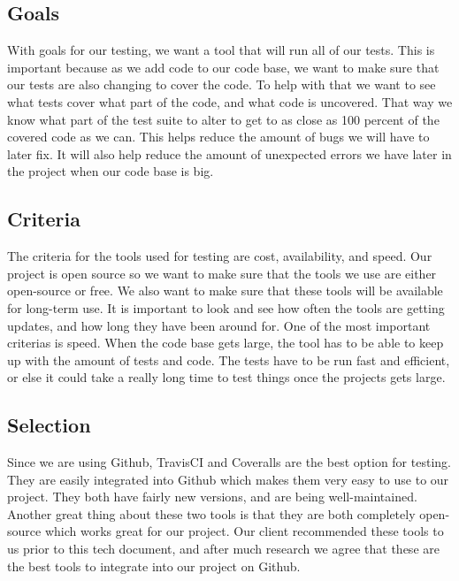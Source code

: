 \documentclass[letterpaper,10pt,draftclsnofoot,onecolumn]{IEEEtran}
\begin{document}
\begin{flushleft}
\subsection{Goals}
With goals for our testing, we want a tool that will run all of our tests. This is important because as we add code to our code base, we want to make sure that our tests are also changing to cover the code. To help with that we want to see what tests cover what part of the code, and what code is uncovered. That way we know what part of the test suite to alter to get to as close as 100 percent of the covered code as we can. This helps reduce the amount of bugs we will have to later fix. It will also help reduce the amount of unexpected errors we have later in the project when our code base is big.





\subsection{Criteria}
The criteria for the tools used for testing are cost, availability, and speed. Our project is open source so we want to make sure that the tools we use are either open-source or free. We also want to make sure that these tools will be available for long-term use. It is important to look and see how often the tools are getting updates, and how long they have been around for. One of the most important criterias is speed. When the code base gets large, the tool has to be able to keep up with the amount of tests and code. The tests have to be run fast and efficient, or else it could take a really long time to test things once the projects gets large.





\subsection{Selection}
Since we are using Github, TravisCI and Coveralls are the best option for testing. They are easily integrated into Github which makes them very easy to use to our project. They both have fairly new versions, and are being well-maintained. Another great thing about these two tools is that they are both completely open-source which works great for our project. Our client recommended these tools to us prior to this tech document, and after much research we agree that these are the best tools to integrate into our project on Github.


\end{flushleft}
\end{document}
